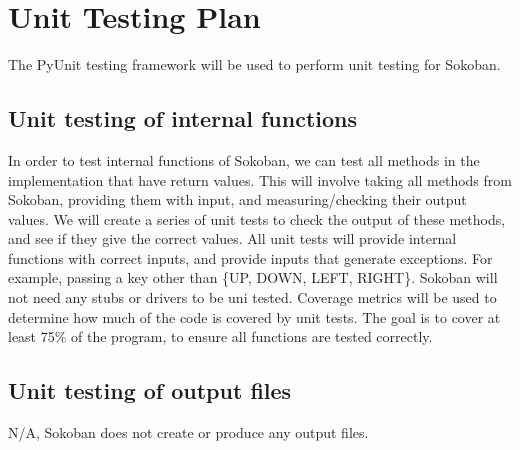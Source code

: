\documentclass[12pt, titlepage]{article}
\begin{document}
\section{Unit Testing Plan}

The PyUnit testing framework will be used to perform unit testing for Sokoban.		

\subsection{Unit testing of internal functions}

In order to test internal functions of Sokoban, we can test all methods in the implementation that have return values. This will involve taking all methods from Sokoban, providing them with input, and measuring/checking their output values. We will create a series of unit tests to check the output of these methods, and see if they give the correct values. All unit tests will provide internal functions with correct inputs, and provide inputs that generate exceptions. For example, passing a key other than \{UP, DOWN, LEFT, RIGHT\}. Sokoban will not need any stubs or drivers to be uni tested. Coverage metrics will be used to determine how much of the code is covered by unit tests. The goal is to cover at least 75\% of the program, to ensure all functions are tested correctly.

\subsection{Unit testing of output files}

N/A, Sokoban does not create or produce any output files.
\end{document}
